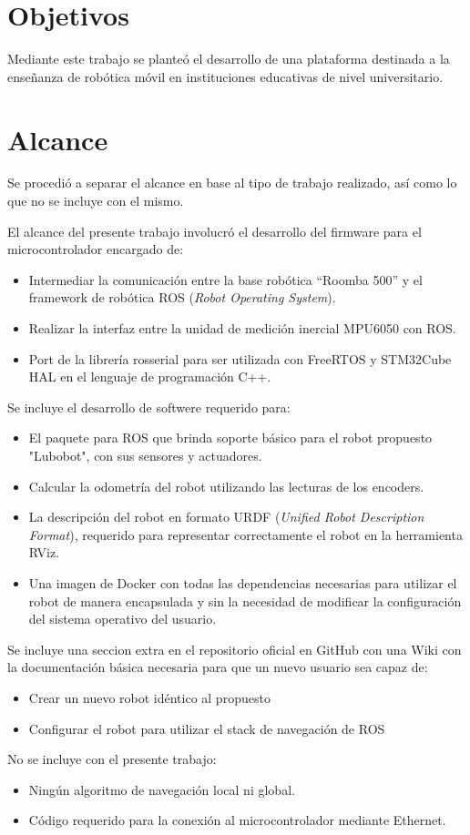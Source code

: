 \section{Objetivos}

Mediante este trabajo se planteó el desarrollo de una plataforma destinada a la enseñanza de robótica móvil en instituciones educativas de nivel universitario.

\section{Alcance}

Se procedió a separar el alcance en base al tipo de trabajo realizado, así como lo que no se incluye con el mismo.

El alcance del presente trabajo involucró el desarrollo del firmware para el microcontrolador encargado de:
\begin{itemize}
	\item Intermediar la comunicación entre la base robótica ``Roomba 500'' y el framework de robótica ROS (\textit{Robot Operating System}).
	\item Realizar la interfaz entre la unidad de medición inercial MPU6050 con ROS.
	\item Port de la librería rosserial para ser utilizada con FreeRTOS y STM32Cube HAL en el lenguaje de programación C++.
\end{itemize}

Se incluye el desarrollo de softwere requerido para:
\begin{itemize}
	\item El paquete para ROS que brinda soporte básico para el robot propuesto "Lubobot", con sus sensores y actuadores.
	\item Calcular la odometría del robot utilizando las lecturas de los encoders.
	\item La descripción del robot en formato URDF (\textit{Unified Robot Description Format}), requerido para representar correctamente el robot en la herramienta RViz.
	\item Una imagen de Docker con todas las dependencias necesarias para utilizar el robot de manera encapsulada y sin la necesidad de modificar la configuración del sistema operativo del usuario.
\end{itemize}

Se incluye una seccion extra en el repositorio oficial en GitHub con una Wiki con la documentación básica necesaria para que un nuevo usuario sea capaz de:

\begin{itemize}
	\item Crear un nuevo robot idéntico al propuesto
	\item Configurar el robot para utilizar el stack de navegación de ROS
\end{itemize} 

No se incluye con el presente trabajo:
\begin{itemize}
	\item Ningún algoritmo de navegación local ni global.
	\item Código requerido para la conexión al microcontrolador mediante Ethernet.
\end{itemize}